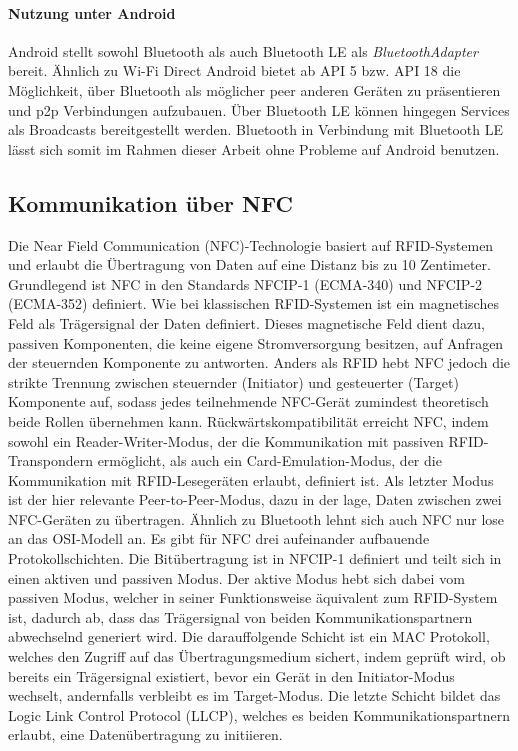         \paragraph{Nutzung unter Android}
        Android stellt sowohl Bluetooth als auch Bluetooth LE als {\it BluetoothAdapter} bereit. Ähnlich zu Wi-Fi Direct  Android bietet ab API 5 bzw. API 18 die Möglichkeit, über Bluetooth als möglicher peer anderen Geräten zu präsentieren und
        p2p Verbindungen aufzubauen. Über Bluetooth LE können hingegen Services als Broadcasts bereitgestellt werden. Bluetooth in Verbindung mit Bluetooth LE lässt sich somit im Rahmen dieser Arbeit ohne Probleme auf Android benutzen.

    \subsection{Kommunikation über NFC}
        Die Near Field Communication (NFC)-Technologie basiert auf RFID-Systemen und erlaubt die Übertragung von Daten auf eine Distanz bis zu 10 Zentimeter.
        Grundlegend ist NFC in den Standards NFCIP-1 (ECMA-340) und NFCIP-2 (ECMA-352) definiert. Wie bei klassischen RFID-Systemen ist ein magnetisches Feld
        als Trägersignal der Daten definiert. Dieses magnetische Feld dient dazu, passiven Komponenten, die keine eigene Stromversorgung besitzen, auf Anfragen
        der steuernden Komponente zu antworten. Anders als RFID hebt NFC jedoch die strikte Trennung zwischen steuernder (Initiator) und gesteuerter (Target) Komponente auf, sodass
        jedes teilnehmende NFC-Gerät zumindest theoretisch beide Rollen übernehmen kann.\cite[S.89]{Langer} Rückwärtskompatibilität erreicht NFC,
        indem sowohl ein Reader-Writer-Modus, der die Kommunikation mit passiven RFID-Transpondern ermöglicht,
        als auch ein Card-Emulation-Modus, der die Kommunikation mit RFID-Lesegeräten erlaubt, definiert ist.\cite[S.99f.]{Langer}
        Als letzter Modus ist der hier relevante Peer-to-Peer-Modus, dazu in der lage, Daten zwischen zwei NFC-Geräten zu übertragen.
        Ähnlich zu Bluetooth lehnt sich auch NFC nur lose an das OSI-Modell an. Es gibt für NFC drei aufeinander aufbauende Protokollschichten.
        Die Bitübertragung ist in NFCIP-1 definiert und teilt sich in einen aktiven und passiven Modus. Der aktive Modus hebt sich dabei vom passiven Modus,
        welcher in seiner Funktionsweise äquivalent zum RFID-System ist, dadurch ab, dass das Trägersignal von beiden Kommunikationspartnern abwechselnd generiert wird.
        Die darauffolgende Schicht ist ein MAC Protokoll, welches den Zugriff auf das Übertragungsmedium sichert, indem geprüft wird, ob bereits ein Trägersignal existiert,
        bevor ein Gerät in den Initiator-Modus wechselt, andernfalls verbleibt es im Target-Modus.
        Die letzte Schicht bildet das Logic Link Control Protocol (LLCP), welches es beiden Kommunikationspartnern erlaubt, eine Datenübertragung zu initiieren.\cite[S91.f, S.97]{Langer}

